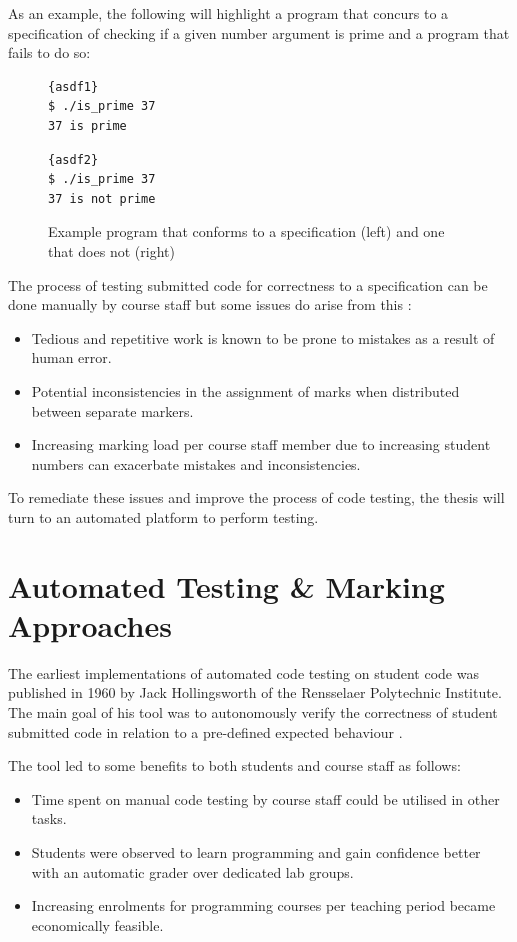 \documentclass[hidelinks]{report}
\begin{document}
As an example, the following will highlight a program that concurs to a specification of checking if a given number argument is prime and a program that fails to do so:
\begin{figure}[h]
	\centering
	\noindent
	\begin{multicols}{2}
		\begin{lstlisting}[linewidth=0.95\linewidth, title=Correct Program, frame=tlrb]{asdf1}
$ ./is_prime 37
37 is prime
		\end{lstlisting}
		\begin{lstlisting}[linewidth=0.95\linewidth, title=Incorrect Program, frame=tlrb]{asdf2}
$ ./is_prime 37
37 is not prime
		\end{lstlisting}
	\end{multicols}
	\caption{Example program that conforms to a specification (left) and one that does not (right)}
	\label{fig:markfigure1}
\end{figure}

The process of testing submitted code for correctness to a specification can be done manually by course staff but some issues do arise from this \cite{ManualProblem}:
\begin{itemize}
	\item Tedious and repetitive work is known to be prone to mistakes as a result of human error.
	\item Potential inconsistencies in the assignment of marks when distributed between separate markers.
	\item Increasing marking load per course staff member due to increasing student numbers can exacerbate mistakes and inconsistencies.
\end{itemize}

To remediate these issues and improve the process of code testing, the thesis will turn to an automated platform to perform testing. 

\clearpage
\section{Automated Testing \& Marking Approaches}

The earliest implementations of automated code testing on student code was published in 1960 by Jack Hollingsworth of the Rensselaer Polytechnic Institute. The main goal of his tool was to autonomously verify the correctness of student submitted code in relation to a pre-defined expected behaviour \cite{AutomatedFirst}.

The tool led to some benefits to both students and course staff as follows:
\begin{itemize}
	\item Time spent on manual code testing by course staff could be utilised in other tasks.
	\item Students were observed to learn programming and gain confidence better with an automatic grader over dedicated lab groups.
	\item Increasing enrolments for programming courses per teaching period became economically feasible.
\end{itemize}
\end{document}

